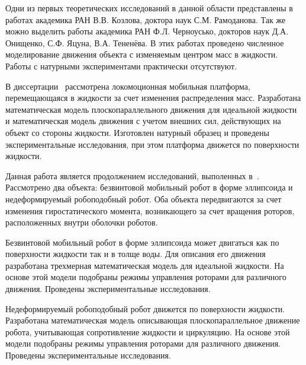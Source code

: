 Одни из первых теоретических исследований в данной области представлены в работах академика РАН В.В. Козлова, доктора наук С.М. Рамоданова. Так же можно выделить работы академика РАН Ф.Л. Черноусько, докторов наук Д.А. Онищенко, С.Ф. Яцуна, В.А. Тененёва. В этих работах проведено численное моделирование движения объекта с изменяемым центром масс в жидкости. Работы с натурными экспериментами практически отсутствуют.

В диссертации~\cite{Klenov_diss} рассмотрена локомоционная мобильная платформа, перемещающаяся в жидкости за счет изменения распределения масс. Разработана математическая модель плоскопараллельного движения для идеальной жидкости и математическая модель движения с учетом внешних сил, действующих на объект со стороны жидкости. Изготовлен натурный образец и проведены экспериментальные исследования, при этом платформа движется по поверхности жидкости.

Данная работа является продолжением исследований, выполенных в~\cite{Klenov_diss}. Рассмотрено два объекта: безвинтовой мобильный робот в форме эллипсоида и недеформируемый робоподобный робот. Оба объекта передвигаются за счет изменения гиростатического момента, возникающего за счет вращения роторов, расположенных внутри оболочки роботов.
 
Безвинтовой мобильный робот в форме эллипсоида может двигаться как по поверхности жидкости так и в толще воды. Для описания его движения разработана трехмерная математическая модель для идеальной жидкости. На основе этой модели подобраны режимы управления роторами для различного движения. Проведены экспериментальные исследования.

Недеформируемый робоподобный робот движется по поверхности жидкости. Разработана математическая модель описывающая плоскопараллельное движение робота, учитывающая сопротивление жидкости и циркуляцию. На основе этой модели подобраны режимы управления роторами для различного движения. Проведены экспериментальные исследования.





